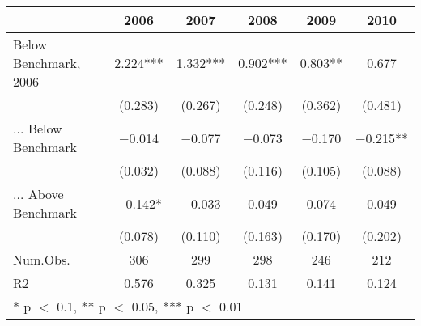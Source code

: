 \begin{table}
\centering
\begin{tabular}[t]{lccccc}
\toprule
  & 2006 & 2007 & 2008 & 2009 & 2010\\
\midrule
Below Benchmark, 2006 & \num{2.224}*** & \num{1.332}*** & \num{0.902}*** & \num{0.803}** & \num{0.677}\\
 & (\num{0.283}) & (\num{0.267}) & (\num{0.248}) & (\num{0.362}) & (\num{0.481})\\
... Below Benchmark & \num{-0.014} & \num{-0.077} & \num{-0.073} & \num{-0.170} & \num{-0.215}**\\
 & (\num{0.032}) & (\num{0.088}) & (\num{0.116}) & (\num{0.105}) & (\num{0.088})\\
... Above Benchmark & \num{-0.142}* & \num{-0.033} & \num{0.049} & \num{0.074} & \num{0.049}\\
 & (\num{0.078}) & (\num{0.110}) & (\num{0.163}) & (\num{0.170}) & (\num{0.202})\\
\midrule
Num.Obs. & \num{306} & \num{299} & \num{298} & \num{246} & \num{212}\\
R2 & \num{0.576} & \num{0.325} & \num{0.131} & \num{0.141} & \num{0.124}\\
\bottomrule
\multicolumn{6}{l}{\rule{0pt}{1em}* p $<$ 0.1, ** p $<$ 0.05, *** p $<$ 0.01}\\
\end{tabular}
\end{table}
